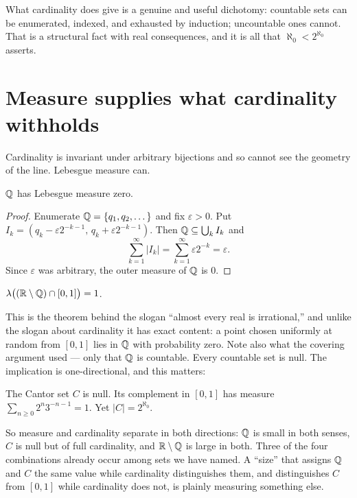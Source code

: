 \documentclass{essay}
\newcommand{\Irr}{\R \setminus \Q}
\begin{document}
What cardinality does give is a genuine and useful dichotomy:
countable sets can be enumerated, indexed, and exhausted by induction;
uncountable ones cannot. That is a structural fact with real
consequences, and it is all that \(\aleph_{0} < 2^{\aleph_{0}}\) asserts.

\section{Measure supplies what cardinality withholds}

Cardinality is invariant under arbitrary bijections and so cannot see
the geometry of the line. Lebesgue measure can.

\begin{theorem}
  \(\mathbb{Q}\) has Lebesgue measure zero.
\end{theorem}

\begin{proof}
  Enumerate \(\mathbb{Q} = \{q_{1}, q_{2}, \dots\}\) and fix \(\varepsilon > 0\). Put
  \(I_{k} = (q_{k} - \varepsilon 2^{-k-1},\, q_{k} + \varepsilon 2^{-k-1})\).
  Then \(\mathbb{Q} \subseteq \bigcup_{k} I_{k}\) and
  \[ \sum_{k=1}^{\infty} |I_{k}| = \sum_{k=1}^{\infty} \varepsilon 2^{-k} = \varepsilon . \]
  Since \(\varepsilon\) was arbitrary, the outer measure of \(\mathbb{Q}\) is \(0\).
\end{proof}

\begin{corollary}
  \(\lambda\big((\Irr) \cap [0,1]\big) = 1\).
\end{corollary}

This is the theorem behind the slogan ``almost every real is
irrational,'' and unlike the slogan about cardinality it has exact
content: a point chosen uniformly at random from \([0,1]\) lies in \(\mathbb{Q}\)
with probability zero. Note also what the covering argument used ---
only that \(\mathbb{Q}\) is countable. Every countable set is null. The
implication is one-directional, and this matters:

\begin{example}
  The Cantor set \(C\) is null. Its complement in \([0,1]\) has measure
  \(\sum_{n \geq 0} 2^{n} 3^{-n-1} = 1\). Yet \(|C| = 2^{\aleph_{0}}\).
\end{example}

So measure and cardinality separate in both directions: \(\mathbb{Q}\) is small
in both senses, \(C\) is null but of full cardinality, and \(\Irr\) is
large in both. Three of the four combinations already occur among sets
we have named. A ``size'' that assigns \(\mathbb{Q}\) and \(C\) the same value
while cardinality distinguishes them, and distinguishes \(C\) from
\([0,1]\) while cardinality does not, is plainly measuring something
else.
\end{document}
